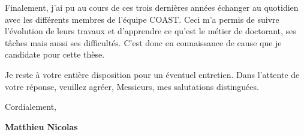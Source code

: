 \documentclass[11pt,a4paper,sans]{moderncv}        %
\newcommand{\tab}{\quad \quad}
\begin{document}




\tab Finalement, j'ai pu au cours de ces trois dernières années
échanger au quotidien avec les différents membres de l'équipe COAST.
Ceci m'a permis de suivre l'évolution de leurs travaux
et d'apprendre ce qu'est le métier de doctorant, ses tâches
mais aussi ses difficultés.
C'est donc en connaissance de cause que je candidate pour cette thèse.


\tab Je reste à votre entière disposition pour un éventuel entretien. Dans l'attente de votre réponse, veuillez agréer, Messieurs, mes salutations distinguées.


Cordialement,\\
\begin{flushright}
\textbf{Matthieu Nicolas}
\end{flushright}
\end{document}
